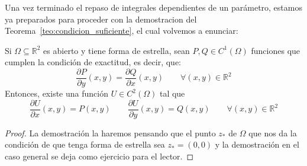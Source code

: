 Una vez terminado el repaso de integrales dependientes de un parámetro, estamos ya preparados para proceder con la demostracion del Teorema~\ref{teo:condicion_suficiente}, el cual volvemos a enunciar:
\begin{teo}
    Si $\Omega\subseteq \mathbb{R}^2$ es abierto y tiene forma de estrella, sean $P,Q\in C^1(\Omega)$ funciones que cumplen la condición de exactitud, es decir, que:
    \begin{equation*}
        \dfrac{\partial P}{\partial y}(x,y) = \dfrac{\partial Q}{\partial x}(x,y) \qquad \forall (x,y)\in \mathbb{R}^2
    \end{equation*}
    Entonces, existe una función $U\in C^2(\Omega)$ tal que 
    \begin{equation*}
        \dfrac{\partial U}{\partial x}(x,y) = P(x,y) \qquad \dfrac{\partial U}{\partial y}(x,y) = Q(x,y) \qquad \forall (x,y)\in \mathbb{R}^2
    \end{equation*}
    \begin{proof}
        La demostración la haremos pensando que el punto $z_\ast$ de $\Omega$ que nos da la condición de que tenga forma de estrella sea $z_\ast = (0,0)$ y la demostración en el caso general se deja como ejercicio para el lector.


\end{proof}
\end{teo}
